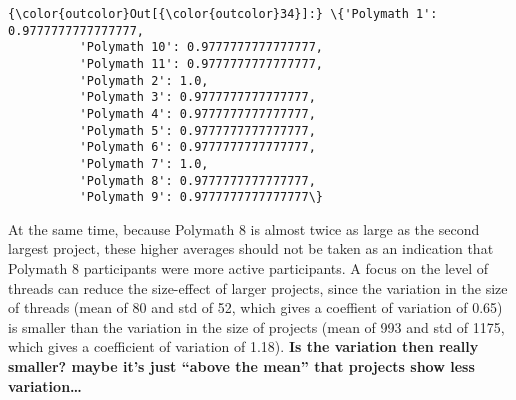 \documentclass[article, floatfix, groupaddress, prb]{revtex4-1}
\begin{document}
    \begin{figure}
        \begin{center}\end{center}
        \caption{}
        \label{}
    \end{figure}
    
    \begin{figure}
        \begin{center}\end{center}
        \caption{}
        \label{}
    \end{figure}
    

            \begin{Verbatim}[commandchars=\\\{\}]
{\color{outcolor}Out[{\color{outcolor}34}]:} \{'Polymath 1': 0.9777777777777777,
          'Polymath 10': 0.9777777777777777,
          'Polymath 11': 0.9777777777777777,
          'Polymath 2': 1.0,
          'Polymath 3': 0.9777777777777777,
          'Polymath 4': 0.9777777777777777,
          'Polymath 5': 0.9777777777777777,
          'Polymath 6': 0.9777777777777777,
          'Polymath 7': 1.0,
          'Polymath 8': 0.9777777777777777,
          'Polymath 9': 0.9777777777777777\}
\end{Verbatim}
        
    At the same time, because Polymath 8 is almost twice as large as the
second largest project, these higher averages should not be taken as an
indication that Polymath 8 participants were more active participants. A
focus on the level of threads can reduce the size-effect of larger
projects, since the variation in the size of threads (mean of 80 and std
of 52, which gives a coeffient of variation of 0.65) is smaller than the
variation in the size of projects (mean of 993 and std of 1175, which
gives a coefficient of variation of 1.18). \textbf{Is the variation then
really smaller? maybe it's just ``above the mean'' that projects show
less variation\ldots{}}




    \begin{figure}
        \begin{center}\end{center}
        \caption{}
        \label{}
    \end{figure}
    
\end{document}
